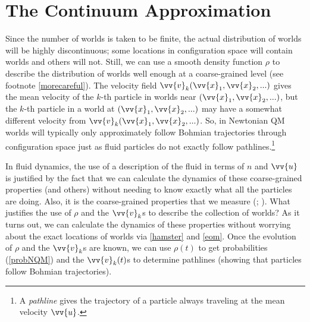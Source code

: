 \documentclass[onecolumn,secnumarabic,balancelastpage,amsmath,amssymb,nofootinbib]{article}
\begin{document}
\section{The Continuum Approximation}\label{badstates}

Since the number of worlds is taken to be finite, the actual distribution of worlds will be highly discontinuous; some locations in configuration space will contain worlds and others will not.  Still, we can use a smooth density function $\rho$ to describe the distribution of worlds well enough at a coarse-grained level (see footnote \ref{morecareful}).  The velocity field $\vv{v}_k(\vv{x}_1,\vv{x}_2,...)$ gives the mean velocity of the $k$-th particle in worlds near $(\vv{x}_1,\vv{x}_2,...)$, but the $k$-th particle in a world at $(\vv{x}_1,\vv{x}_2,...)$ may have a somewhat different velocity from $\vv{v}_k(\vv{x}_1,\vv{x}_2,...)$.  So, in Newtonian QM worlds will typically only approximately follow Bohmian trajectories through configuration space just as fluid particles do not exactly follow pathlines.\footnote{A \emph{pathline} gives the trajectory of a particle always traveling at the mean velocity $\vv{u}$.}

In fluid dynamics, the use of a description of the fluid in terms of $n$ and $\vv{u}$ is justified by the fact that we can calculate the dynamics of these coarse-grained properties (and others) without needing to know exactly what all the particles are doing.  Also, it is the coarse-grained properties that we measure (\citealp[]{batchelor1967}; \citealp[]{chapman1970}).  What justifies the use of $\rho$ and the $\vv{v}_k$s to describe the collection of worlds?  As it turns out, we can calculate the dynamics of these properties without worrying about the exact locations of worlds via \eqref{hamster} and \eqref{eom}.  Once the evolution of $\rho$ and the $\vv{v}_k$s are known, we can use $\rho(t)$ to get probabilities (\textsection \ref{probNQM}) and the $\vv{v}_k(t)$s to determine pathlines (showing that particles follow Bohmian trajectories).
\end{document}
